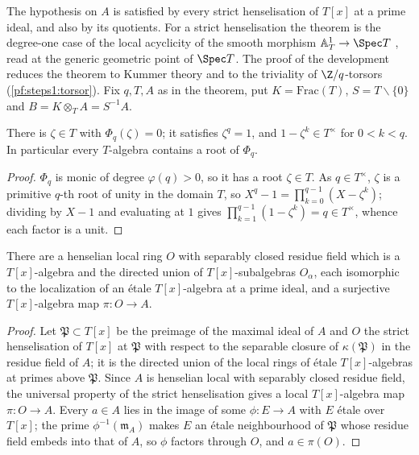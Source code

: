 The hypothesis on $A$ is satisfied by every strict henselisation of $T[x]$ at a prime ideal, and also by its
quotients. For a strict henselisation the theorem is the degree-one case of the local acyclicity of the smooth
morphism $\mathbb A^1_T\to\Spec T$ \cite[Exp.~XV, Th.~2.1]{ArtinGrothendieckVerdier1972}, read at the generic
geometric point of $\Spec T$. The proof of the development reduces the theorem to Kummer theory and to the
triviality of $\Z/q$-torsors (\cref{pf:steps1:torsor}). Fix $q,T,A$ as in the theorem, put $K=\mathrm{Frac}(T)$,
$S=T\smallsetminus\{0\}$ and $B=K\otimes_TA=S^{-1}A$.

\begin{lemma}\label{pf:steps1:zeta}
There is $\zeta\in T$ with $\Phi_q(\zeta)=0$; it satisfies $\zeta^q=1$, and $1-\zeta^k\in T^\times$ for $0<k<q$. In
particular every $T$-algebra contains a root of $\Phi_q$.
\end{lemma}

\begin{proof}
$\Phi_q$ is monic of degree $\varphi(q)>0$, so it has a root $\zeta\in T$. As $q\in T^\times$, $\zeta$ is a primitive
$q$-th root of unity in the domain $T$, so $X^q-1=\prod_{k=0}^{q-1}(X-\zeta^k)$; dividing by $X-1$ and evaluating at
$1$ gives $\prod_{k=1}^{q-1}(1-\zeta^k)=q\in T^\times$, whence each factor is a unit.
\end{proof}

\begin{lemma}\label{pf:steps1:shpres}
There are a henselian local ring $O$ with separably closed residue field which is a $T[x]$-algebra and the directed
union of $T[x]$-subalgebras $O_\alpha$, each isomorphic to the localization of an \'etale $T[x]$-algebra at a prime
ideal, and a surjective $T[x]$-algebra map $\pi\colon O\to A$.
\end{lemma}

\begin{proof}
Let $\mathfrak P\subset T[x]$ be the preimage of the maximal ideal of $A$ and $O$ the strict henselisation of $T[x]$
at $\mathfrak P$ with respect to the separable closure of $\kappa(\mathfrak P)$ in the residue field of $A$; it is the
directed union of the local rings of \'etale $T[x]$-algebras at primes above $\mathfrak P$. Since $A$ is henselian
local with separably closed residue field, the universal property of the strict henselisation gives a local
$T[x]$-algebra map $\pi\colon O\to A$. Every $a\in A$ lies in the image of some $\phi\colon E\to A$ with $E$ \'etale over
$T[x]$; the prime $\phi^{-1}(\mathfrak m_A)$ makes $E$ an \'etale neighbourhood of $\mathfrak P$ whose residue field
embeds into that of $A$, so $\phi$ factors through $O$, and $a\in\pi(O)$.
\end{proof}

